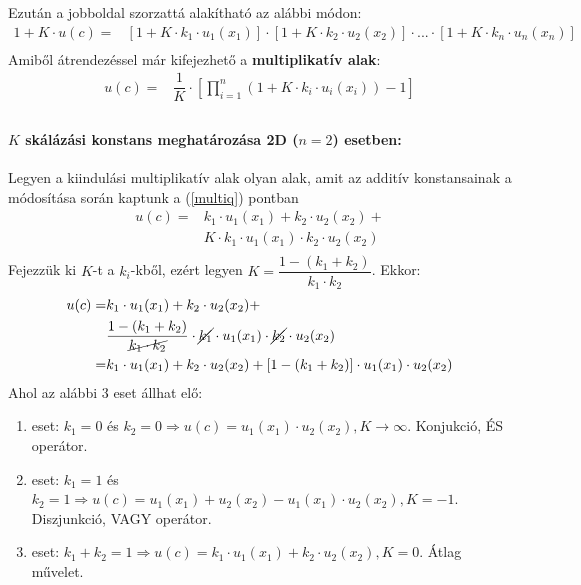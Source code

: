 \documentclass[a4paper,12pt]{article}
\begin{document}
Ezután a jobboldal szorzattá alakítható az alábbi módon:
\begin{equation}
\begin{split}
1 + K\cdot u(c) = & [1 + K\cdot k_1\cdot u_1(x_1)] \cdot  [1 + K\cdot k_2\cdot u_2(x_2)] \cdot  ...  \cdot  [1 + K\cdot k_n\cdot u_n(x_n)]\\
\end{split}
\end{equation}
Amiből átrendezéssel már kifejezhető a \textbf{multiplikatív alak}: 
\begin{equation}
\begin{split}
u(c) = & \dfrac{1}{K} \cdot  [ \prod_{i=1}^n ( 1 + K\cdot k_i\cdot u_i(x_i)) - 1 ]\\
\end{split}
\end{equation}

\paragraph{$K$ skálázási konstans meghatározása 2D ($n=2$) esetben:} 

Legyen a kiindulási multiplikatív alak olyan alak, amit az additív konstansainak a módosítása során kaptunk a (\ref{multiq}) pontban
\begin{equation}
\begin{split}
u(c) = & k_1\cdot u_1(x_1) + k_2\cdot u_2(x_2)+ \\
&K\cdot  k_{1}\cdot u_1(x_1)\cdot k_{2}\cdot u_2(x_2) \\
\end{split}
\end{equation}
Fejezzük ki $K$-t a $k_i$-kből, ezért legyen $K = \dfrac{1 - (k_1 + k_2)}{k_1\cdot k_2}$. Ekkor:
\begin{equation}
\begin{split}
u(c) = & k_1\cdot u_1(x_1) + k_2\cdot u_2(x_2)+ \\
&\dfrac{1 - (k_1 + k_2)}{ \cancel{k_1\cdot k_2} } \cdot   \cancel{k_{1}}\cdot u_1(x_1)\cdot  \cancel{k_{2}}\cdot u_2(x_2) \\
= & k_1\cdot u_1(x_1) + k_2\cdot u_2(x_2)+ [1 - (k_1 + k_2)]\cdot u_1(x_1)\cdot u_2(x_2) \\
\end{split}
\end{equation}
Ahol az alábbi 3 eset állhat elő:
\begin{enumerate}
\item eset: $k_1 = 0$ és $k_2 = 0 \Rightarrow u(c) = u_1(x_1) \cdot  u_2(x_2), K \rightarrow \infty$. Konjukció, ÉS operátor. 
\item eset: $k_1 = 1$ és $k_2 = 1 \Rightarrow u(c) = u_1(x_1) + u_2(x_2) - u_1(x_1)\cdot  u_2(x_2), K = -1$. Diszjunkció, VAGY operátor.  
\item eset: $k_1 + k_2 = 1 \Rightarrow u(c) = k_1\cdot u_1(x_1) + k_2\cdot u_2(x_2), K = 0 $. Átlag művelet.
\end{enumerate} 
\end{document}
